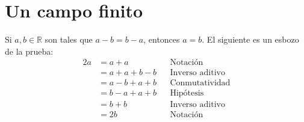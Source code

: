 \documentclass[11pt]{article}
\newcommand{\R}{\mathbb{R}}
\begin{document}
\pagebreak

\section*{Un campo finito}

Si $a,b\in \R$ son tales que $a-b=b-a$, entonces $a=b$. El siguiente es un esbozo de la prueba:
\vspace{1em}\begin{align*}
    2a %
    &= a + a && \text{Notación}\\
    &= a+a+b-b && \text{Inverso aditivo}\\
    &= a-b+a+b && \text{Conmutatividad}\\
    &= b-a +a +b && \text{Hipótesis}\\
    &= b+b && \text{Inverso aditivo}\\
    &= 2b && \text{Notación}
\end{align*}
\end{document}
